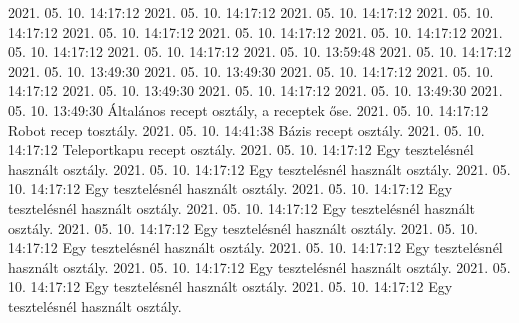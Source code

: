  {2021. 05. 10. 14:17:12} {}
 {2021. 05. 10. 14:17:12} {}
 {2021. 05. 10. 14:17:12} {}
 {2021. 05. 10. 14:17:12} {}
 {2021. 05. 10. 14:17:12} {}
 {2021. 05. 10. 14:17:12} {}
 {2021. 05. 10. 14:17:12} {}
 {2021. 05. 10. 14:17:12} {}
 {2021. 05. 10. 14:17:12} {}
 {2021. 05. 10. 13:59:48} {}
 {2021. 05. 10. 14:17:12} {}
 {2021. 05. 10. 13:49:30} {}
 {2021. 05. 10. 13:49:30} {}
 {2021. 05. 10. 14:17:12} {}
 {2021. 05. 10. 14:17:12} {}
 {2021. 05. 10. 13:49:30} {}
 {2021. 05. 10. 14:17:12} {}
 {2021. 05. 10. 13:49:30} {}
 {2021. 05. 10. 13:49:30} {Általános recept osztály, a receptek őse.}
 {2021. 05. 10. 14:17:12} {Robot recep tosztály.}
 {2021. 05. 10. 14:41:38} {Bázis recept osztály.}
 {2021. 05. 10. 14:17:12} {Teleportkapu recept osztály.}
 {2021. 05. 10. 14:17:12} {Egy tesztelésnél használt osztály.}
 {2021. 05. 10. 14:17:12} {Egy tesztelésnél használt osztály.}
 {2021. 05. 10. 14:17:12} {Egy tesztelésnél használt osztály.}
 {2021. 05. 10. 14:17:12} {Egy tesztelésnél használt osztály.}
 {2021. 05. 10. 14:17:12} {Egy tesztelésnél használt osztály.}
 {2021. 05. 10. 14:17:12} {Egy tesztelésnél használt osztály.}
 {2021. 05. 10. 14:17:12} {Egy tesztelésnél használt osztály.}
 {2021. 05. 10. 14:17:12} {Egy tesztelésnél használt osztály.}
 {2021. 05. 10. 14:17:12} {Egy tesztelésnél használt osztály.}
 {2021. 05. 10. 14:17:12} {Egy tesztelésnél használt osztály.}
 {2021. 05. 10. 14:17:12} {Egy tesztelésnél használt osztály.}
